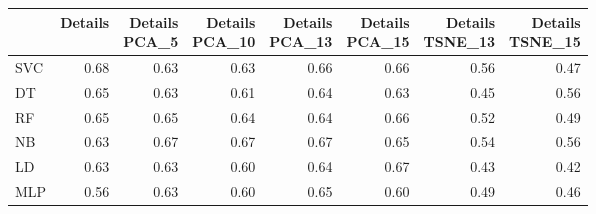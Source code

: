 \documentclass[12pt,italian]{report}
\begin{document}
\begin{table}[h]
	\begin{center}
		\begin{adjustbox}{max width=\textwidth}
			\begin{tabular}{lrrrrrrr}
				\toprule
				{} &   Details &  \thead{Details\\PCA\_5} &  \thead{Details\\PCA\_10} &  \thead{Details\\PCA\_13} &  \thead{Details\\PCA\_15} &  \thead{Details\\TSNE\_13} &  \thead{Details\\TSNE\_15} \\
				\midrule
				SVC &  0.68 &                  0.63 &                   0.63 &                   0.66 &                   0.66 &                    0.56 &                    0.47 \\
				DT  &  \cellcolor{cyan}0.65 &                  0.63 &                   0.61 &                   0.64 &                   0.63 &                    0.45 &                    0.56 \\
				RF  &  0.65 &                  0.65 &                   0.64 &                   0.64 &                   \cellcolor{cyan}0.66 &                    0.52 &                    0.49 \\
				NB  &  0.63 &                  0.67 &                   0.67 &                   0.67 &                   0.65 &                    0.54 &                    0.56 \\
				LD  &  0.63 &                  0.63 &                   0.60 &                   0.64 &                   0.67 &                    0.43 &                    0.42 \\
				MLP &  0.56 &                  0.63 &                   0.60 &                   0.65 &                   0.60 &                    0.49 &                    0.46 \\
				\bottomrule
			\end{tabular}
		\end{adjustbox}
	\end{center}
\end{table}
\end{document}
